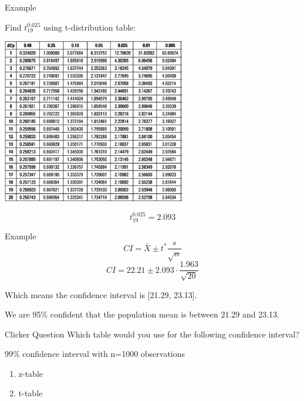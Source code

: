 \documentclass{beamer}
\begin{document}
\begin{frame}{Example}
	\begin{center}
		Find $t^{0.025}_{19}$ using t-distribution table:

		\includegraphics[width=0.6\textwidth]{t_table3}
	\end{center}
	$$t^{0.025}_{19}=2.093$$
\end{frame}

\begin{frame}{Example}
	$$CI = \bar{X} \pm t^* \frac{s}{\sqrt{n}}$$
	$$CI = 22.21 \pm 2.093 \cdot \frac{1.963}{\sqrt{20}}$$
	 
	Which means the confidence interval is [21.29, 23.13].
	
	We are 95\% confident that the population mean is between 21.29 and 23.13.
\end{frame}


\begin{frame}{Clicker Question}
	Which table would you use for the following confidence interval?
	
	\begin{center}
		99\% confidence interval with n=1000 observations
	\end{center}
	\begin{enumerate}[label=(\alph*)]
		\item z-table
		\item t-table

	\end{enumerate}
\end{frame}
\end{document}
